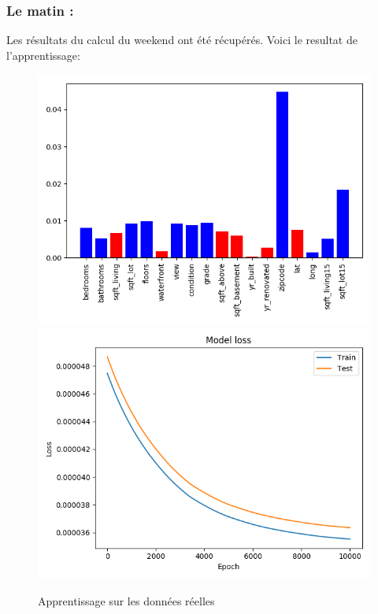 \subsubsection*{Le matin :}

Les résultats du calcul du weekend ont été récupérés.
Voici le resultat de l'apprentissage:
\begin{figure}[H]
    \center
    \includegraphics[height=\petit]{sources/data/Obj2/real/graphs/default_10000_1.png}
    \includegraphics[height=\petit]{sources/data/Obj2/real/graphs/default_10000_1_learn.png}
	\caption{Apprentissage sur les données réelles}
	\label{def_10000_1}
\end{figure}


